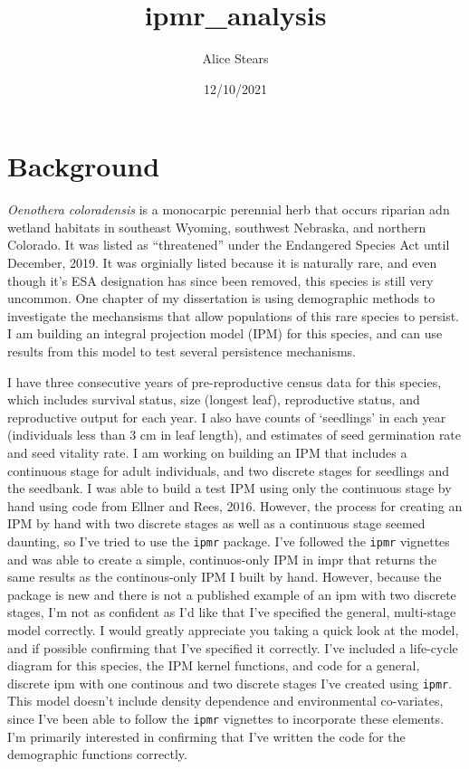 \documentclass[
]{article}
\title{ipmr\_analysis}
\author{Alice Stears}
\date{12/10/2021}
\begin{document}
\maketitle

\hypertarget{background}{%
\section{Background}\label{background}}

\emph{Oenothera coloradensis} is a monocarpic perennial herb that occurs
riparian adn wetland habitats in southeast Wyoming, southwest Nebraska,
and northern Colorado. It was listed as ``threatened'' under the
Endangered Species Act until December, 2019. It was orginially listed
because it is naturally rare, and even though it's ESA designation has
since been removed, this species is still very uncommon. One chapter of
my dissertation is using demographic methods to investigate the
mechansisms that allow populations of this rare species to persist. I am
building an integral projection model (IPM) for this species, and can
use results from this model to test several persistence mechanisms.

I have three consecutive years of pre-reproductive census data for this
species, which includes survival status, size (longest leaf),
reproductive status, and reproductive output for each year. I also have
counts of `seedlings' in each year (individuals less than 3 cm in leaf
length), and estimates of seed germination rate and seed vitality rate.
I am working on building an IPM that includes a continuous stage for
adult individuals, and two discrete stages for seedlings and the
seedbank. I was able to build a test IPM using only the continuous stage
by hand using code from Ellner and Rees, 2016. However, the process for
creating an IPM by hand with two discrete stages as well as a continuous
stage seemed daunting, so I've tried to use the \texttt{ipmr} package.
I've followed the \texttt{ipmr} vignettes and was able to create a
simple, continuos-only IPM in impr that returns the same results as the
continous-only IPM I built by hand. However, because the package is new
and there is not a published example of an ipm with two discrete stages,
I'm not as confident as I'd like that I've specified the general,
multi-stage model correctly. I would greatly appreciate you taking a
quick look at the model, and if possible confirming that I've specified
it correctly. I've included a life-cycle diagram for this species, the
IPM kernel functions, and code for a general, discrete ipm with one
continous and two discrete stages I've created using \texttt{ipmr}. This
model doesn't include density dependence and environmental co-variates,
since I've been able to follow the \texttt{ipmr} vignettes to
incorporate these elements. I'm primarily interested in confirming that
I've written the code for the demographic functions correctly.
\end{document}
